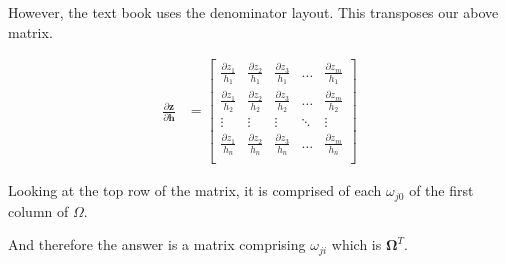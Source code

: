 \documentclass{article}
\begin{document}
However, the text book uses the denominator layout.  This transposes our above matrix.

\begin{align*}
   \frac{\partial{\boldsymbol{z}}}{\partial{\boldsymbol{h}}} &=
   \begin{bmatrix}
      \frac{\partial{z}_{1}}{h_{1}} & \frac{\partial{z}_{2}}{h_{1}} &\frac{\partial{z}_{3}}{h_{1}} & \dots  & \frac{\partial{z}_{m}}{h_{1}} \\
      \frac{\partial{z}_{1}}{h_{2}} & \frac{\partial{z}_{2}}{h_{2}} &\frac{\partial{z}_{3}}{h_{2}} & \dots  & \frac{\partial{z}_{m}}{h_{2}} \\
      \vdots & \vdots & \vdots & \ddots & \vdots \\
      \frac{\partial{z}_{1}}{h_{n}} & \frac{\partial{z}_{2}}{h_{n}} &\frac{\partial{z}_{3}}{h_{n}} & \dots  & \frac{\partial{z}_{m}}{h_{n}} \\
  \end{bmatrix}
\end{align*}

Looking at the top row of the matrix, it is comprised of each $\omega_{j0}$ of the first column of $\Omega$.

And therefore the answer is a matrix comprising $\omega_{ji}$ which is $\boldsymbol{\Omega}^{T}$.
\end{document}
